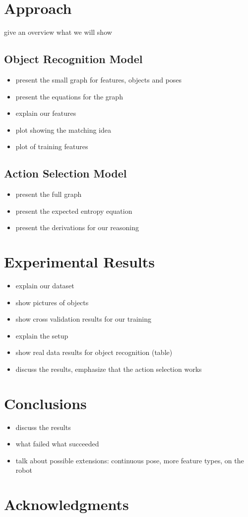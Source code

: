 \documentclass[conference]{IEEEtran}
\begin{document}
\section{Approach}
give an overview what we will show

\subsection{Object Recognition Model}
\begin{itemize}
\item present the small graph for features, objects and poses
\item present the equations for the graph
\item explain our features
\item plot showing the matching idea
\item plot of training features
\end{itemize}

\subsection{Action Selection Model}
\begin{itemize}
\item present the full graph
\item present the expected entropy equation
\item present the derivations for our reasoning
\end{itemize}

\section{Experimental Results}
\begin{itemize}
\item explain our dataset
\item show pictures of objects
\item show cross validation results for our training
\item explain the setup
\item show real data results for object recognition (table)
\item discuss the results, emphasize that the action selection works
\end{itemize}

\section{Conclusions}
\begin{itemize}
\item discuss the results
\item what failed what succeeded
\item talk about possible extensions: continuous pose, more feature types, on the robot
\end{itemize}

\section*{Acknowledgments}

\cite{McGeer01041990}







\end{document}
